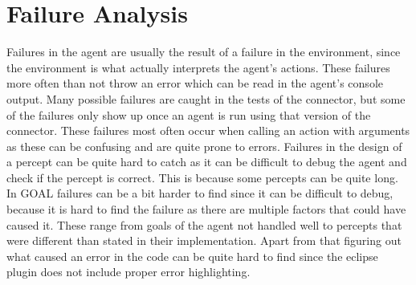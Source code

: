\section{Failure Analysis}
Failures in the agent are usually the result of a failure in the environment, since the environment is what actually interprets the agent's actions.
These failures more often than not throw an error which can be read in the agent's console output.
Many possible failures are caught in the tests of the connector, but some of the failures only show up once an agent is run using that version of the connector.
These failures most often occur when calling an action with arguments as these can be confusing and are quite prone to errors.
Failures in the design of a percept can be quite hard to catch as it can be difficult to debug the agent and check if the percept is correct. This is because some percepts can be quite long.
In GOAL failures can be a bit harder to find since it can be difficult to debug, because it is hard to find the failure as there are multiple factors that could have caused it. These range from goals of the agent not handled well to percepts that were different than stated in their implementation.
Apart from that figuring out what caused an error in the code can be quite hard to find since the eclipse plugin does not include proper error highlighting.
